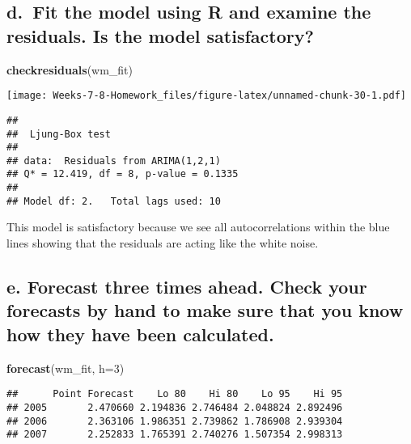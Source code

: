 \documentclass[]{article}
\newenvironment{Shaded}{\begin{snugshade}}{\end{snugshade}}
\newcommand{\DataTypeTok}[1]{\textcolor[rgb]{0.13,0.29,0.53}{#1}}
\newcommand{\DecValTok}[1]{\textcolor[rgb]{0.00,0.00,0.81}{#1}}
\newcommand{\KeywordTok}[1]{\textcolor[rgb]{0.13,0.29,0.53}{\textbf{#1}}}
\newcommand{\NormalTok}[1]{#1}
\begin{document}
\hypertarget{d.-fit-the-model-using-r-and-examine-the-residuals.-is-the-model-satisfactory}{%
\subsection{d.~Fit the model using R and examine the residuals. Is the
model
satisfactory?}\label{d.-fit-the-model-using-r-and-examine-the-residuals.-is-the-model-satisfactory}}

\begin{Shaded}
\begin{Highlighting}[]
\KeywordTok{checkresiduals}\NormalTok{(wm_fit)}
\end{Highlighting}
\end{Shaded}

\texttt{[image: Weeks-7-8-Homework\_files/figure-latex/unnamed-chunk-30-1.pdf]}

\begin{verbatim}
## 
##  Ljung-Box test
## 
## data:  Residuals from ARIMA(1,2,1)
## Q* = 12.419, df = 8, p-value = 0.1335
## 
## Model df: 2.   Total lags used: 10
\end{verbatim}

This model is satisfactory because we see all autocorrelations within
the blue lines showing that the residuals are acting like the white
noise.

\hypertarget{e.-forecast-three-times-ahead.-check-your-forecasts-by-hand-to-make-sure-that-you-know-how-they-have-been-calculated.}{%
\subsection{e. Forecast three times ahead. Check your forecasts by hand
to make sure that you know how they have been
calculated.}\label{e.-forecast-three-times-ahead.-check-your-forecasts-by-hand-to-make-sure-that-you-know-how-they-have-been-calculated.}}

\begin{Shaded}
\begin{Highlighting}[]
\KeywordTok{forecast}\NormalTok{(wm_fit, }\DataTypeTok{h=}\DecValTok{3}\NormalTok{)}
\end{Highlighting}
\end{Shaded}

\begin{verbatim}
##      Point Forecast    Lo 80    Hi 80    Lo 95    Hi 95
## 2005       2.470660 2.194836 2.746484 2.048824 2.892496
## 2006       2.363106 1.986351 2.739862 1.786908 2.939304
## 2007       2.252833 1.765391 2.740276 1.507354 2.998313
\end{verbatim}
\end{document}
